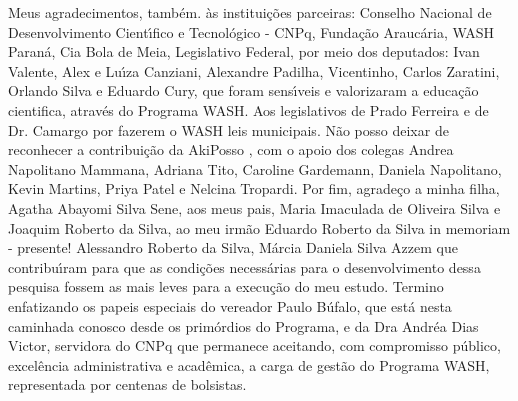 \begin{agradecimentos}
Meus agradecimentos, tamb\'em. \`as institui\c{c}\~oes parceiras: Conselho Nacional de Desenvolvimento Cient\'{\i}fico e Tecnol\'ogico - CNPq, Funda\c{c}\~ao Arauc\'aria, WASH Paran\'a, Cia Bola de Meia, Legislativo Federal, por meio dos deputados: Ivan Valente, Alex e Lu\'{\i}za Canziani, Alexandre Padilha, Vicentinho, Carlos Zaratini, Orlando Silva e Eduardo Cury, que foram sens\'{\i}veis e valorizaram a educa\c{c}\~ao cientifica, atrav\'es do Programa WASH. Aos legislativos de Prado Ferreira e  de Dr. Camargo por fazerem o WASH leis municipais. N\~ao posso deixar de reconhecer a contribui\c{c}\~ao da AkiPosso , com o apoio dos colegas  Andrea Napolitano Mammana, Adriana Tito, Caroline Gardemann, Daniela Napolitano, Kevin Martins, Priya Patel e Nelcina Tropardi. Por fim, agrade\c{c}o a minha filha, Agatha Abayomi Silva Sene, aos meus pais, Maria Imaculada de Oliveira Silva e Joaquim Roberto da Silva, ao meu irm\~ao Eduardo Roberto da Silva in memoriam - presente! Alessandro Roberto da Silva, M\'arcia Daniela Silva Azzem que contribu\'{\i}ram para que as condi\c{c}\~oes necess\'arias para o desenvolvimento dessa pesquisa fossem as mais leves para a execu\c{c}\~ao do meu estudo.
Termino enfatizando os papeis especiais do vereador Paulo B\'ufalo, que est\'a nesta caminhada conosco desde os prim\'ordios do Programa, e da Dra Andr\'ea Dias Victor, servidora do CNPq que permanece aceitando, com compromisso p\'ublico, excel\^encia administrativa e acad\^emica, a carga de gest\~ao do Programa WASH, representada por centenas de bolsistas.

\end{agradecimentos}
